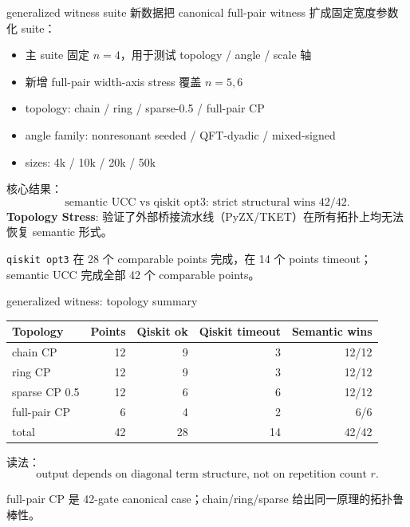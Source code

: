 \documentclass[aspectratio=169,11pt]{ctexbeamer}
\begin{document}
\begin{frame}{generalized witness suite}
  \small
  新数据把 canonical full-pair witness 扩成固定宽度参数化 suite：

  \vspace{0.4em}
  \begin{itemize}
    \item 主 suite 固定 $n=4$，用于测试 topology / angle / scale 轴
    \item 新增 full-pair width-axis stress 覆盖 $n=5,6$
    \item topology: chain / ring / sparse-0.5 / full-pair CP
    \item angle family: nonresonant seeded / QFT-dyadic / mixed-signed
    \item sizes: 4k / 10k / 20k / 50k
  \end{itemize}

  \vspace{0.6em}
  核心结果：
  \[
    \text{semantic UCC vs qiskit opt3:
    strict structural wins } 42/42.
  \]
  \textbf{Topology Stress}: 验证了外部桥接流水线（PyZX/TKET）在所有拓扑上均无法恢复 semantic 形式。

  \vspace{0.4em}
  \texttt{qiskit opt3} 在 28 个 comparable points 完成，在 14 个 points timeout；
  semantic UCC 完成全部 42 个 comparable points。
\end{frame}

\begin{frame}{generalized witness: topology summary}
  \scriptsize
  \begin{tabular}{lrrrr}
    \toprule
    Topology & Points & Qiskit ok & Qiskit timeout & Semantic wins \\
    \midrule
    chain CP & 12 & 9 & 3 & 12/12 \\
    ring CP & 12 & 9 & 3 & 12/12 \\
    sparse CP 0.5 & 12 & 6 & 6 & 12/12 \\
    full-pair CP & 6 & 4 & 2 & 6/6 \\
    \midrule
    total & 42 & 28 & 14 & 42/42 \\
    \bottomrule
  \end{tabular}

  \vspace{0.8em}
  读法：
  \[
    \text{output depends on diagonal term structure, not on repetition count } r.
  \]

  \vspace{0.4em}
  full-pair CP 是 42-gate canonical case；chain/ring/sparse 给出同一原理的拓扑鲁棒性。
\end{frame}
\end{document}
